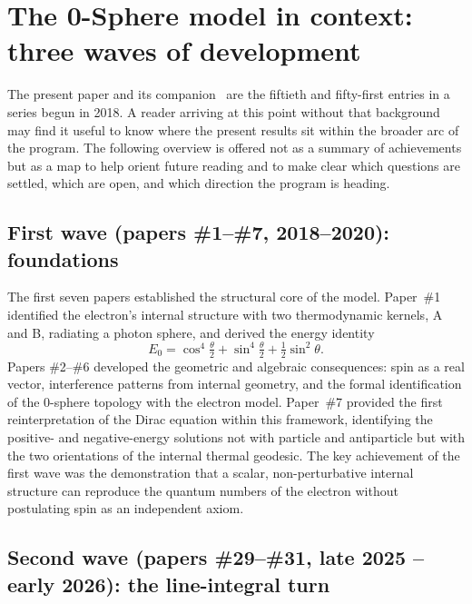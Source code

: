\documentclass[%
 reprint, amsmath,amssymb, aps, prb, ]{revtex4-2}
\numberwithin{equation}{section}
\begin{document}
\section{The 0-Sphere model in context: three waves of development}
\label{sec:threewaves}

The present paper and its companion~\cite{hanamura50} are the fiftieth and fifty-first entries in a series begun in 2018. A reader arriving at this point without that background may find it useful to know where the present results sit within the broader arc of the program. The following overview is offered not as a summary of achievements but as a map to help orient future reading and to make clear which questions are settled, which are open, and which direction the program is heading.

\subsection*{First wave (papers \#1--\#7, 2018--2020): foundations}

The first seven papers established the structural core of the model. Paper~\#1~\cite{hanamura01} identified the electron's internal structure with two thermodynamic kernels, A and B, radiating a photon sphere, and derived the energy identity
\begin{equation*}
E_0 = \cos^4\!\tfrac{\theta}{2} + \sin^4\!\tfrac{\theta}{2} + \tfrac{1}{2}\sin^2\theta.
\end{equation*}
Papers \#2--\#6 developed the geometric and algebraic consequences: spin as a real vector, interference patterns from internal geometry, and the formal identification of the 0-sphere topology with the electron model. Paper~\#7 provided the first reinterpretation of the Dirac equation within this framework, identifying the positive- and negative-energy solutions not with particle and antiparticle but with the two orientations of the internal thermal geodesic. The key achievement of the first wave was the demonstration that a scalar, non-perturbative internal structure can reproduce the quantum numbers of the electron without postulating spin as an independent axiom.

\subsection*{Second wave (papers \#29--\#31, late 2025 -- early 2026): the line-integral turn}
\end{document}
